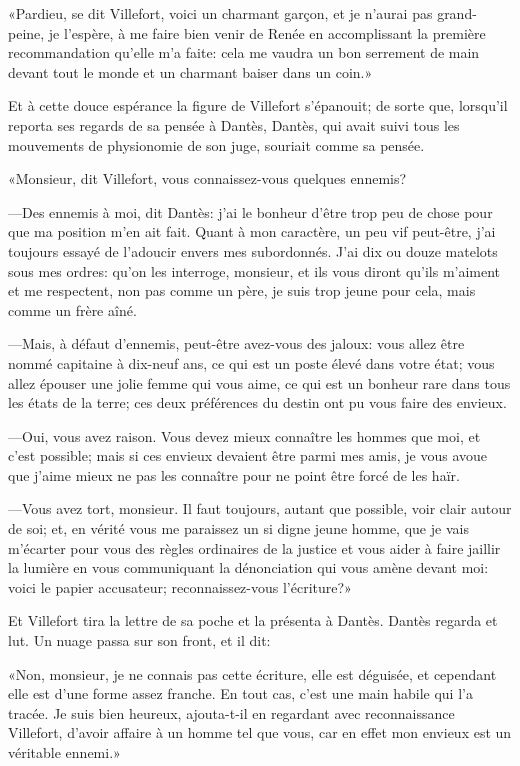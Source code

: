 «Pardieu, se dit Villefort, voici un charmant garçon, et je n'aurai pas grand-peine, je l'espère, à me faire bien venir de Renée en accomplissant la première recommandation qu'elle m'a faite: cela me vaudra un bon serrement de main devant tout le monde et un charmant baiser dans un coin.»

Et à cette douce espérance la figure de Villefort s'épanouit; de sorte que, lorsqu'il reporta ses regards de sa pensée à Dantès, Dantès, qui avait suivi tous les mouvements de physionomie de son juge, souriait comme sa pensée.

«Monsieur, dit Villefort, vous connaissez-vous quelques ennemis?

—Des ennemis à moi, dit Dantès: j'ai le bonheur d'être trop peu de chose pour que ma position m'en ait fait. Quant à mon caractère, un peu vif peut-être, j'ai toujours essayé de l'adoucir envers mes subordonnés. J'ai dix ou douze matelots sous mes ordres: qu'on les interroge, monsieur, et ils vous diront qu'ils m'aiment et me respectent, non pas comme un père, je suis trop jeune pour cela, mais comme un frère aîné.

—Mais, à défaut d'ennemis, peut-être avez-vous des jaloux: vous allez être nommé capitaine à dix-neuf ans, ce qui est un poste élevé dans votre état; vous allez épouser une jolie femme qui vous aime, ce qui est un bonheur rare dans tous les états de la terre; ces deux préférences du destin ont pu vous faire des envieux.

—Oui, vous avez raison. Vous devez mieux connaître les hommes que moi, et c'est possible; mais si ces envieux devaient être parmi mes amis, je vous avoue que j'aime mieux ne pas les connaître pour ne point être forcé de les haïr.

—Vous avez tort, monsieur. Il faut toujours, autant que possible, voir clair autour de soi; et, en vérité vous me paraissez un si digne jeune homme, que je vais m'écarter pour vous des règles ordinaires de la justice et vous aider à faire jaillir la lumière en vous communiquant la dénonciation qui vous amène devant moi: voici le papier accusateur; reconnaissez-vous l'écriture?»

Et Villefort tira la lettre de sa poche et la présenta à Dantès. Dantès regarda et lut. Un nuage passa sur son front, et il dit:

«Non, monsieur, je ne connais pas cette écriture, elle est déguisée, et cependant elle est d'une forme assez franche. En tout cas, c'est une main habile qui l'a tracée. Je suis bien heureux, ajouta-t-il en regardant avec reconnaissance Villefort, d'avoir affaire à un homme tel que vous, car en effet mon envieux est un véritable ennemi.»

